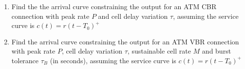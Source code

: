 \begin{problem}
\begin{enumerate}
                \item Find the the arrival curve constraining the output for
                an ATM CBR connection with peak rate $P$ and cell delay
                variation $\tau$, assuming the service curve is $c(t) =
                r(t-T_{0})^{+}$

                \item Find the arrival curve constraining the output
                for an ATM VBR connection with peak rate $P$, cell delay
                variation $\tau$, sustainable cell rate $M$ and burst
                tolerance $\tau_{B}$ (in seconds), assuming the service curve
                is $c(t) = r(t-T_{0})^{+}$
\end{enumerate}

\end{problem}
